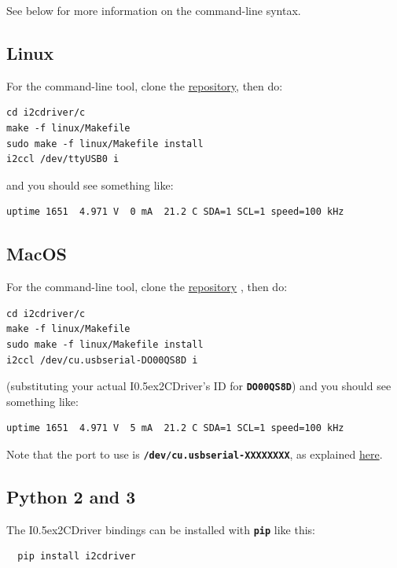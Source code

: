 \documentclass{article}
\newcommand{\two}{\raise0.5ex\hbox{\footnotesize{2}}}
\newcommand{\iicdriver}{I\two{}CDriver}
\newcommand{\mach}[1]{\texttt{\textbf{#1}}}
\begin{document}
See below for more information on the command-line syntax.

\subsection{Linux}

For the command-line tool, clone the
\href{https://github.com/jamesbowman/i2cdriver}{repository},
then do:

\begin{lstlisting}
cd i2cdriver/c
make -f linux/Makefile
sudo make -f linux/Makefile install
i2ccl /dev/ttyUSB0 i
\end{lstlisting}

and you should see something like:

\begin{lstlisting}
uptime 1651  4.971 V  0 mA  21.2 C SDA=1 SCL=1 speed=100 kHz
\end{lstlisting}

\subsection{MacOS}

For the command-line tool, clone the
\href{https://github.com/jamesbowman/i2cdriver}{repository}
, then do:

\begin{lstlisting}
cd i2cdriver/c
make -f linux/Makefile
sudo make -f linux/Makefile install
i2ccl /dev/cu.usbserial-DO00QS8D i
\end{lstlisting}

(substituting your actual \iicdriver{}'s ID for \mach{DO00QS8D})
and you should see something like:

\begin{lstlisting}
uptime 1651  4.971 V  5 mA  21.2 C SDA=1 SCL=1 speed=100 kHz
\end{lstlisting}

Note that the port to use is \mach{/dev/cu.usbserial-XXXXXXXX}, as explained
\href{https://pbxbook.com/other/mac-tty.html}{here}.

\subsection{Python 2 and 3}

The \iicdriver{} bindings can be installed with \mach{pip} like this:

\begin{lstlisting}
  pip install i2cdriver
\end{lstlisting}
\end{document}

